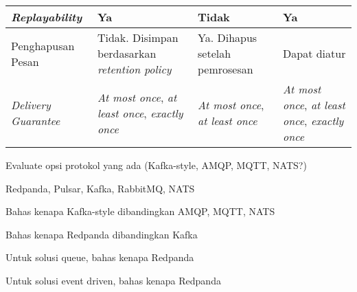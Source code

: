 \begin{longtable}{|p{}|p{}|p{}|p{}|}
    \hline
    \textit{Replayability}       & Ya                                                                   & Tidak                                         & Ya                                                                   \\
    \hline
    Penghapusan Pesan            & Tidak. Disimpan berdasarkan \textit{retention policy}                & Ya. Dihapus setelah pemrosesan                & Dapat diatur                                                         \\
    \hline
    \textit{Delivery Guarantee}  & \textit{At most once}, \textit{at least once}, \textit{exactly once} & \textit{At most once}, \textit{at least once} & \textit{At most once}, \textit{at least once}, \textit{exactly once} \\
    \hline
\end{longtable}
\endgroup


Evaluate opsi protokol yang ada (Kafka-style, AMQP, MQTT, NATS?)

Redpanda, Pulsar, Kafka, RabbitMQ, NATS

Bahas kenapa Kafka-style dibandingkan AMQP, MQTT, NATS

Bahas kenapa Redpanda dibandingkan Kafka

Untuk solusi queue, bahas kenapa Redpanda

Untuk solusi event driven, bahas kenapa Redpanda
